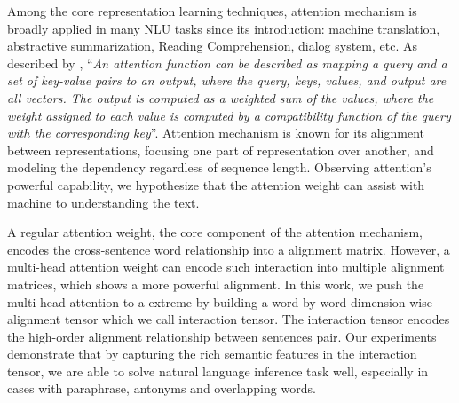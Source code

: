 \documentclass{article} \usepackage{iclr2018_conference,times}
\begin{document}
Among the core representation learning techniques, attention mechanism is broadly applied in many NLU tasks since its introduction: machine translation\citep{first_attention_Bahdanau:2014vz}, abstractive summarization\citep{att_abstractive_summ_2015arXiv150900685R}, Reading Comprehension\citep{att_read_comp_Hermann:2015taa}, dialog system\citep{att_dialogue_Mei:2016tk}, etc. As described by \citet{AttentionIsALLYouNeedVaswani:2017ul}, ``\textit{An attention function can be described as mapping a query and a set of key-value pairs to an output, where the query, keys, values, and output are all vectors. The output is computed as a weighted sum of the values, where the weight assigned to each value is computed by a compatibility function of the query with the corresponding key}''. Attention mechanism is known for its alignment between representations, focusing one part of representation over another, and modeling the dependency regardless of sequence length.
Observing attention's powerful capability, we hypothesize that the attention weight can assist with machine to understanding the text. 

A regular attention weight, the core component of the attention mechanism, encodes the cross-sentence word relationship into a alignment matrix. However, a multi-head attention weight\citet{AttentionIsALLYouNeedVaswani:2017ul} can encode such interaction into multiple alignment matrices, which shows a more powerful alignment. In this work, we push the multi-head attention to a extreme by building a word-by-word dimension-wise alignment tensor which we call interaction tensor. The interaction tensor encodes the high-order alignment relationship between sentences pair. Our experiments demonstrate that by capturing the rich semantic features in the interaction tensor, we are able to solve natural language inference task well, especially in cases with paraphrase, antonyms and overlapping words.
\end{document}
